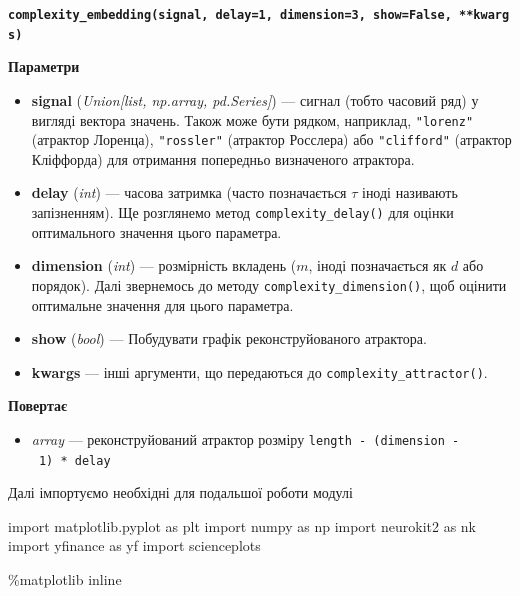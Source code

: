 \documentclass[
  letterpaper,
]{report}
\newenvironment{Shaded}{\begin{snugshade}}{\end{snugshade}}
\newcommand{\ImportTok}[1]{\textcolor[rgb]{0.00,0.46,0.62}{#1}}
\newcommand{\NormalTok}[1]{\textcolor[rgb]{0.00,0.23,0.31}{#1}}
\newcommand{\OperatorTok}[1]{\textcolor[rgb]{0.37,0.37,0.37}{#1}}
\providecommand{\tightlist}{%
  \setlength{\itemsep}{0pt}\setlength{\parskip}{0pt}}\usepackage{longtable,booktabs,array}
\begin{document}
\textbf{\texttt{complexity\_embedding(signal,\ delay=1,\ dimension=3,\ show=False,\ **kwargs)}}

\textbf{Параметри}

\begin{itemize}
\tightlist
\item
  \textbf{signal} (\emph{Union{[}list, np.array, pd.Series{]}}) ---
  сигнал (тобто часовий ряд) у вигляді вектора значень. Також може бути
  рядком, наприклад, \texttt{"lorenz"} (атрактор Лоренца),
  \texttt{"rossler"} (атрактор Росслера) або \texttt{"clifford"}
  (атрактор Кліффорда) для отримання попередньо визначеного атрактора.
\item
  \textbf{delay} (\emph{int}) --- часова затримка (часто позначається
  \(\tau\) іноді називають запізненням). Ще розглянемо метод
  \texttt{complexity\_delay()} для оцінки оптимального значення цього
  параметра.
\item
  \textbf{dimension} (\emph{int}) --- розмірність вкладень (\(m\), іноді
  позначається як \(d\) або порядок). Далі звернемось до методу
  \texttt{complexity\_dimension()}, щоб оцінити оптимальне значення для
  цього параметра.
\item
  \textbf{show} (\emph{bool}) --- Побудувати графік реконструйованого
  атрактора.
\item
  \textbf{kwargs} --- інші аргументи, що передаються до
  \texttt{complexity\_attractor()}.
\end{itemize}

\textbf{Повертає}

\begin{itemize}
\tightlist
\item
  \emph{array} --- реконструйований атрактор розміру
  \texttt{length\ -\ (dimension\ -\ 1)\ *\ delay}
\end{itemize}

Далі імпортуємо необхідні для подальшої роботи модулі

\begin{Shaded}
\begin{Highlighting}[]
\ImportTok{import}\NormalTok{ matplotlib.pyplot }\ImportTok{as}\NormalTok{ plt }
\ImportTok{import}\NormalTok{ numpy }\ImportTok{as}\NormalTok{ np}
\ImportTok{import}\NormalTok{ neurokit2 }\ImportTok{as}\NormalTok{ nk}
\ImportTok{import}\NormalTok{ yfinance }\ImportTok{as}\NormalTok{ yf}
\ImportTok{import}\NormalTok{ scienceplots}

\OperatorTok{\%}\NormalTok{matplotlib inline}
\end{Highlighting}
\end{Shaded}
\end{document}
